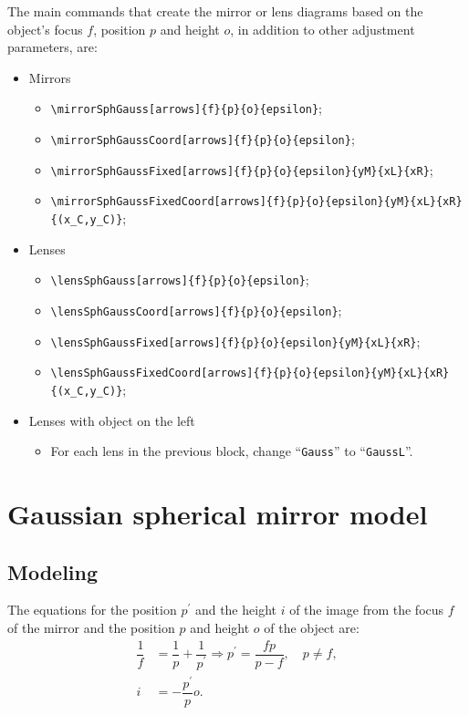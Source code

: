 \documentclass[a4paper,10pt]{article}
\begin{document}
The main commands that create the mirror or lens diagrams based on the object's focus $f$, position $p$ and height $o$, in addition to other adjustment parameters, are:
\begin{itemize}
  \item Mirrors
  \begin{itemize}
    \item \verb|\mirrorSphGauss[arrows]{f}{p}{o}{epsilon}|;
    \item \verb|\mirrorSphGaussCoord[arrows]{f}{p}{o}{epsilon}|;
    \item \verb|\mirrorSphGaussFixed[arrows]{f}{p}{o}{epsilon}{yM}{xL}{xR}|;
    \item \verb|\mirrorSphGaussFixedCoord[arrows]{f}{p}{o}{epsilon}{yM}{xL}{xR}{(x_C,y_C)}|;
  \end{itemize}
  \item Lenses
  \begin{itemize}
    \item \verb|\lensSphGauss[arrows]{f}{p}{o}{epsilon}|;
    \item \verb|\lensSphGaussCoord[arrows]{f}{p}{o}{epsilon}|;
    \item \verb|\lensSphGaussFixed[arrows]{f}{p}{o}{epsilon}{yM}{xL}{xR}|;
    \item \verb|\lensSphGaussFixedCoord[arrows]{f}{p}{o}{epsilon}{yM}{xL}{xR}{(x_C,y_C)}|;
  \end{itemize}
  \item Lenses with object on the left
  \begin{itemize}
    \item For each lens in the previous block, change \enquote{\texttt{Gauss}} to \enquote{\texttt{GaussL}}.
  \end{itemize}
\end{itemize}

\section{Gaussian spherical mirror model}

\subsection{Modeling}

The equations for the position $p^{\prime}$ and the height $i$ of the image from the focus $f$ of the mirror and the position $p$ and height $o$ of the object are:
\begin{equation}
  \begin{split}
    \dfrac{1}{f} & = \dfrac{1}{p} + \dfrac{1}{p^{\prime}} \Rightarrow p^{\prime} = \dfrac{f p}{p - f}, \quad p \neq f, \\
    i            & = - \dfrac{p^{\prime}}{p} o.
  \end{split}
\end{equation}
\end{document}

